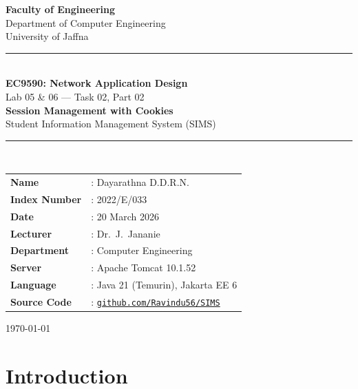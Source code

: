 \documentclass[12pt, a4paper]{article}
\begin{document}
\begin{titlepage}
    \centering
    \vspace*{1cm}

    {\Large \textbf{Faculty of Engineering}}\\[0.3cm]
    {\large Department of Computer Engineering}\\[0.3cm]
    {\large University of Jaffna}\\[1.5cm]

    \rule{\linewidth}{0.5mm}\\[0.4cm]
    {\LARGE \textbf{EC9590: Network Application Design}}\\[0.3cm]
    {\Large Lab 05 \& 06 --- Task 02, Part 02}\\[0.3cm]
    {\huge \textbf{Session Management with Cookies}}\\[0.3cm]
    {\large Student Information Management System (SIMS)}\\
    \rule{\linewidth}{0.5mm}\\[1.5cm]

    \begin{tabular}{ll}
        \textbf{Name}       & : Dayarathna D.D.R.N. \\[0.3cm]
        \textbf{Index Number} & : 2022/E/033 \\[0.3cm]
        \textbf{Date}       & : 20 March 2026 \\[0.3cm]
        \textbf{Lecturer}   & : Dr.\ J.\ Jananie \\[0.3cm]
        \textbf{Department} & : Computer Engineering \\[0.3cm]
        \textbf{Server}     & : Apache Tomcat 10.1.52 \\[0.3cm]
        \textbf{Language}   & : Java 21 (Temurin), Jakarta EE 6 \\
        \textbf{Source Code} & : \href{https://github.com/Ravindu56/SIMS}
                             {\texttt{github.com/Ravindu56/SIMS}} \\
    \end{tabular}

    \vfill
    {\large \today}
\end{titlepage}

\tableofcontents
\newpage

\section{Introduction}
\end{document}

